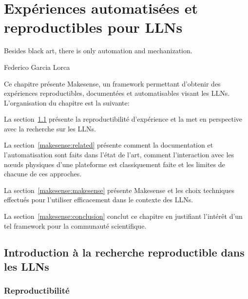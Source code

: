 
\chapter{Expériences automatisées et reproductibles pour \ac{LLN}s} 
\label{makesense}


\epigraph{Besides black art, there is only automation and mechanization.}{Federico Garcia Lorca}

\minitoc

Ce chapitre présente Makesense, un framework permettant d'obtenir des expériences reproductibles, documentées et automatisables visant les \ac{LLN}s.
L'organisation du chapitre est la suivante:

La section~\ref{makesense:reproductibility} présente la reproductibilité d'expérience et la met en perspective avec la recherche sur les \ac{LLN}s.

La section~\ref{makesense:related} présente comment la documentation et l'automatisation sont faits dans l'état de l'art, comment l'interaction avec les nœuds physiques d'une plateforme est classiquement faite et les limites de chacune de ces approches.

La section~\ref{makesense:makesense} présente Makesense et les choix techniques effectués pour l'utiliser efficacement dans le contexte des \ac{LLN}s.

La section~\ref{makesense:conclusion} conclut ce chapitre en justifiant l'intérêt d'un tel framework pour la communauté scientifique.

\section{Introduction à la recherche reproductible dans les \ac{LLN}s}
\label{makesense:reproductibility}

\subsection{Reproductibilité}

